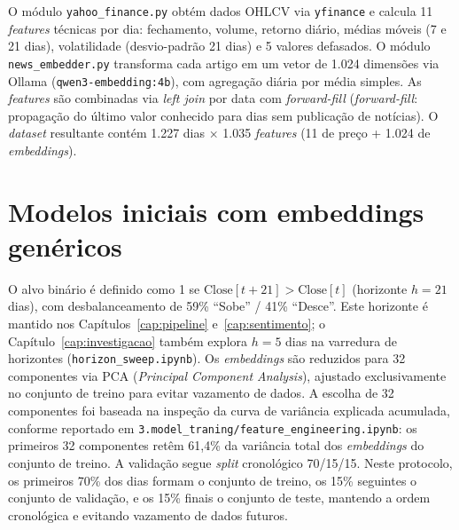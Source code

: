 O módulo \texttt{yahoo\_finance.py} obtém dados OHLCV via \texttt{yfinance} e calcula 11 \textit{features} técnicas por dia: fechamento, volume, retorno diário, médias móveis (7 e 21 dias), volatilidade (desvio-padrão 21 dias) e 5 valores defasados. O módulo \texttt{news\_embedder.py} transforma cada artigo em um vetor de 1.024 dimensões via Ollama (\texttt{qwen3-embedding:4b}), com agregação diária por média simples. As \textit{features} são combinadas via \textit{left join} por data com \textit{forward-fill} (\textit{forward-fill}: propagação do último valor conhecido para dias sem publicação de notícias). O \textit{dataset} resultante contém 1.227 dias $\times$ 1.035 \textit{features} (11 de preço + 1.024 de \textit{embeddings}).

\section{Modelos iniciais com embeddings genéricos}\label{sec:modelos_iniciais}

O alvo binário é definido como 1 se $\text{Close}[t+21] > \text{Close}[t]$ (horizonte $h=21$ dias), com desbalanceamento de 59\% ``Sobe'' / 41\% ``Desce''. Este horizonte é mantido nos Capítulos~\ref{cap:pipeline} e~\ref{cap:sentimento}; o Capítulo~\ref{cap:investigacao} também explora $h=5$ dias na varredura de horizontes (\texttt{horizon\_sweep.ipynb}). Os \textit{embeddings} são reduzidos para 32 componentes via PCA (\textit{Principal Component Analysis}), ajustado exclusivamente no conjunto de treino para evitar vazamento de dados. A escolha de 32 componentes foi baseada na inspeção da curva de variância explicada acumulada, conforme reportado em \texttt{3.model\_traning/feature\_engineering.ipynb}: os primeiros 32 componentes retêm 61,4\% da variância total dos \textit{embeddings} do conjunto de treino. A validação segue \textit{split} cronológico 70/15/15. Neste protocolo, os primeiros 70\% dos dias formam o conjunto de treino, os 15\% seguintes o conjunto de validação, e os 15\% finais o conjunto de teste, mantendo a ordem cronológica e evitando vazamento de dados futuros.

